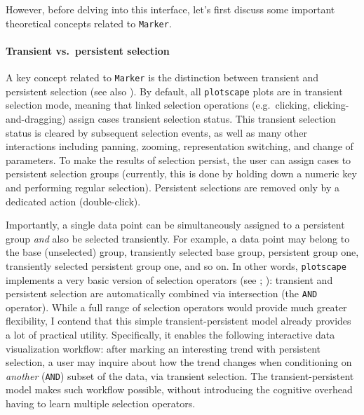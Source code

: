 \documentclass[
  openany]{book}
\theoremstyle{definition}
\theoremstyle{definition}
\theoremstyle{definition}
\theoremstyle{definition}
\theoremstyle{remark}
\begin{document}
However, before delving into this interface, let's first discuss some important theoretical concepts related to \texttt{Marker}.

\paragraph{Transient vs.~persistent selection}\label{transient-persistent}

A key concept related to \texttt{Marker} is the distinction between transient and persistent selection (see also ). By default, all \texttt{plotscape} plots are in transient selection mode, meaning that linked selection operations (e.g.~clicking, clicking-and-dragging) assign cases transient selection status. This transient selection status is cleared by subsequent selection events, as well as many other interactions including panning, zooming, representation switching, and change of parameters. To make the results of selection persist, the user can assign cases to persistent selection groups (currently, this is done by holding down a numeric key and performing regular selection). Persistent selections are removed only by a dedicated action (double-click).

Importantly, a single data point can be simultaneously assigned to a persistent group \emph{and} also be selected transiently. For example, a data point may belong to the base (unselected) group, transiently selected base group, persistent group one, transiently selected persistent group one, and so on. In other words, \texttt{plotscape} implements a very basic version of selection operators (see ; ): transient and persistent selection are automatically combined via intersection (the \texttt{AND} operator). While a full range of selection operators would provide much greater flexibility, I contend that this simple transient-persistent model already provides a lot of practical utility. Specifically, it enables the following interactive data visualization workflow: after marking an interesting trend with persistent selection, a user may inquire about how the trend changes when conditioning on \emph{another} (\texttt{AND}) subset of the data, via transient selection. The transient-persistent model makes such workflow possible, without introducing the cognitive overhead having to learn multiple selection operators.
\end{document}
